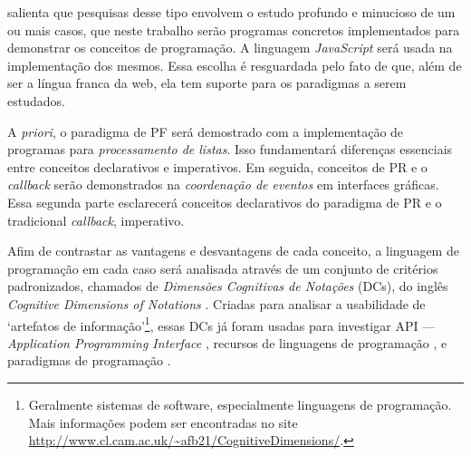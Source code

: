 \textcite{yin2001} salienta que pesquisas desse tipo envolvem o estudo profundo
e minucioso de um ou mais casos, que neste trabalho serão programas concretos
implementados para demonstrar os conceitos de programação.
A linguagem \emph{JavaScript} será usada na implementação dos mesmos.
Essa escolha é resguardada pelo fato de que, além de ser a língua franca da
web, ela tem suporte para os paradigmas a serem estudados.

A \emph{priori}, o paradigma de PF será demostrado com a implementação de programas
para \emph{processamento de listas}.
Isso fundamentará diferenças essenciais entre conceitos declarativos e
imperativos.
Em seguida, conceitos de PR e o \emph{callback} serão demonstrados na \emph{coordenação
de eventos} em interfaces gráficas.
Essa segunda parte esclarecerá conceitos declarativos do paradigma de PR e o
tradicional \emph{callback}, imperativo.

Afim de contrastar as vantagens e desvantagens de cada conceito, a linguagem de
programação em cada caso será analisada através de um conjunto de critérios
padronizados, chamados de \emph{Dimensões Cognitivas de Notações} (DCs), do inglês
\emph{Cognitive Dimensions of Notations} \cite{green1989}.
Criadas para analisar a usabilidade de ‘artefatos de
informação’\footnote{Geralmente sistemas de software, especialmente linguagens de
programação. Mais informações podem ser encontradas no site
\url{http://www.cl.cam.ac.uk/\~afb21/CognitiveDimensions/}.}, essas DCs já foram usadas para investigar API
— \emph{Application Programming Interface} \cite{clarke2003}, recursos de linguagens
de programação \cite{sadowski2011}, e paradigmas de programação \cite{kiss2014}.

